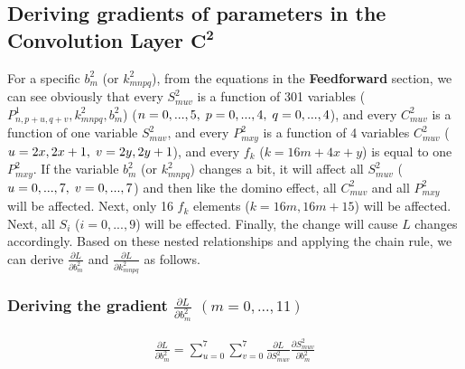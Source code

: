 \documentclass[a4paper,12pt]{article}
\begin{document}
\subsection{Deriving gradients of parameters in the Convolution Layer $\boldsymbol{C^2}$}
For a specific $b^2_m$ (or $k^2_{mnpq}$), from the equations in the \textbf{Feedforward} section, we can see obviously that every $S^2_{muv}$ is a function of 301 variables ($P^1_{n, p+u, q+v}, k^2_{mnpq}, b^2_{m}$) ($n = 0,...,5,\thickspace p = 0,...,4,\thickspace q = 0,...,4$), and every $C^2_{muv}$ is a function of one variable $S^2_{muv}$, and every $P^2_{mxy}$ is a function of 4 variables $C^2_{muv}$ ($u = 2x, 2x + 1,\thickspace v = 2y, 2y + 1$), and every $f_k$ ($k = 16m + 4x + y$) is equal to one $P^2_{mxy}$. If the variable $b^2_m$ (or $k^2_{mnpq}$) changes a bit, it will affect all $S^2_{muv}$ ($u = 0,...,7,\thickspace v = 0,...,7$) and then like the domino effect, all $C^2_{muv}$ and all $P^2_{mxy}$ will be affected. Next, only 16 $f_k$ elements ($k = 16m, 16m + 15$) will be affected. Next, all $S_i$ ($i = 0, ..., 9$) will be effected. Finally, the change will cause $L$ changes accordingly. Based on these nested relationships and applying the chain rule, we can derive $\frac{\partial{L}}{\partial{b^2_m}}$ and $\frac{\partial{L}}{\partial{k^2_{mnpq}}}$ as follows.

\subsubsection{Deriving the gradient $\frac{\partial{L}}{\partial{b^2_m}}$ $(m = 0, ..., 11)$}
\begin{equation}
\begin{aligned}
\frac{\partial{L}}{\partial{b^2_{m}}} = \sum\limits_{u = 0}^{7}\sum\limits_{v = 0}^{7}\frac{\partial{L}}{\partial{S^2_{muv}}}\frac{\partial{S^2_{muv}}}{\partial{b^2_{m}}}\label{eq31}
\end{aligned}
\end{equation}
\end{document}

